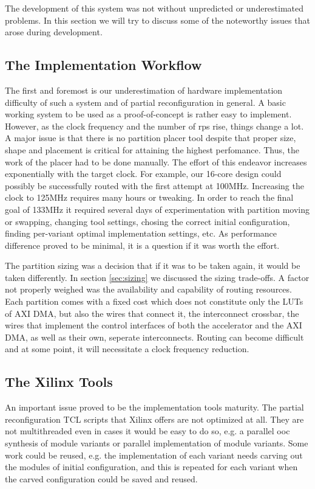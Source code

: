 The development of this system was not without unpredicted or underestimated problems. In this section
we will try to discuss some of the noteworthy issues that arose during development.

\subsection{The Implementation Workflow}

The first and foremost is our underestimation of hardware implementation difficulty of such a system and of partial
reconfiguration in general. A basic working system to be used as a proof-of-concept is rather easy to implement.
However, as the clock frequency and the number of \glspl{rp} rise, things change a lot. A major issue is that there is
no partition placer tool despite that proper size, shape and placement is critical for attaining the highest perfomance.
Thus, the work of the placer had to be done manually. The effort of this endeavor increases exponentially with the target clock.
For example, our 16-core design could possibly be successfully routed with the first attempt at 100MHz. Increasing the clock
to 125MHz requires many hours or tweaking. In order to reach the final goal of 133MHz it required several days of experimentation
with partition moving or swapping, changing tool settings, chosing the correct initial configuration, finding per-variant
optimal implementation settings, etc. As performance difference proved to be minimal, it is a question if it was worth the effort.

The partition sizing was a decision that if it was to be taken again, it would be taken differently.
In section \ref{sec:sizing} we discussed the sizing trade-offs. A factor not properly weighed was the
availability and capability of routing resources. Each partition comes with a fixed cost which does
not constitute only the LUTs of AXI DMA, but also the wires that connect it, the interconnect crossbar,
the wires that implement the control interfaces of both the accelerator and the AXI DMA, as well as their own,
seperate interconnects. Routing can become difficult and at some point, it will necessitate a clock frequency reduction.


\subsection{The Xilinx Tools}

An important issue proved to be the implementation tools maturity. The partial reconfiguration TCL scripts that Xilinx offers
are not optimized at all. They are not multithreaded even in cases it would be easy to do so, e.g. a parallel \gls{ooc} synthesis
of module variants or parallel implementation of module variants. Some work could be reused, e.g.
the implementation of each variant needs carving out the modules of initial configuration,
and this is repeated for each variant when the carved configuration could be saved and reused. 


